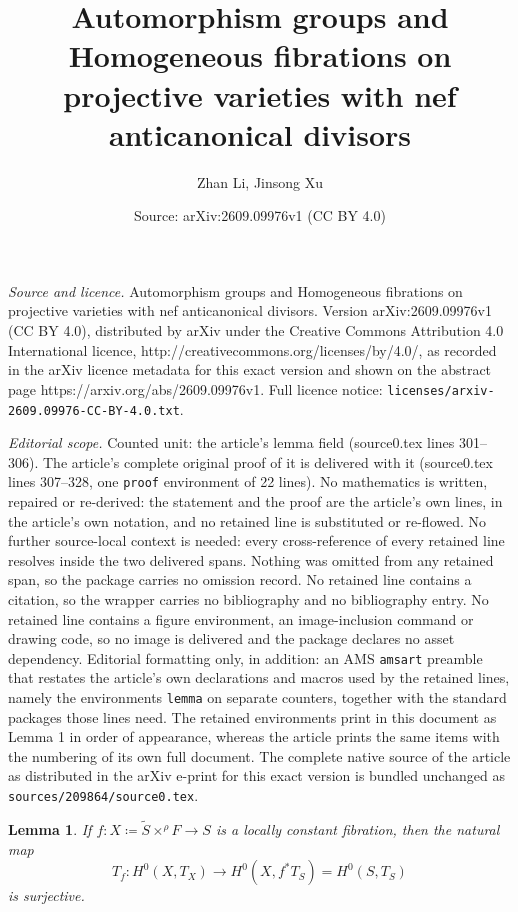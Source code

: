\documentclass[10pt,a4paper]{amsart}
\title{Automorphism groups and Homogeneous fibrations on projective varieties with nef anticanonical divisors}
\author{Zhan Li, Jinsong Xu}
\date{Source: arXiv:2609.09976v1 (CC BY 4.0)}
\newtheorem{lemma}{Lemma}
\newcommand{\ti}{\tilde}
\begin{document}
\maketitle

\noindent\emph{Source and licence.} Automorphism groups and Homogeneous fibrations on projective varieties with nef anticanonical divisors. Version arXiv:2609.09976v1 (CC BY 4.0), distributed by arXiv under the Creative Commons Attribution 4.0 International licence, http://creativecommons.org/licenses/by/4.0/, as recorded in the arXiv licence metadata for this exact version and shown on the abstract page https://arxiv.org/abs/2609.09976v1. Full licence notice: \texttt{licenses/arxiv-2609.09976-CC-BY-4.0.txt}.\par\smallskip

\noindent\textit{Editorial scope.} Counted unit: the article's lemma field (source0.tex lines 301--306). The article's complete original proof of it is delivered with it (source0.tex lines 307--328, one \texttt{proof} environment of 22 lines). No mathematics is written, repaired or re-derived: the statement and the proof are the article's own lines, in the article's own notation, and no retained line is substituted or re-flowed.  No further source-local context is needed: every cross-reference of every retained line resolves inside the two delivered spans.  Nothing was omitted from any retained span, so the package carries no omission record.  No retained line contains a citation, so the wrapper carries no bibliography and no bibliography entry.  No retained line contains a figure environment, an image-inclusion command or drawing code, so no image is delivered and the package declares no asset dependency.  Editorial formatting only, in addition: an AMS \texttt{amsart} preamble that restates the article's own declarations and macros used by the retained lines, namely the environments \texttt{lemma} on separate counters, together with the standard packages those lines need.  The retained environments print in this document as Lemma 1 in order of appearance, whereas the article prints the same items with the numbering of its own full document.  The complete native source of the article as distributed in the arXiv e-print for this exact version is bundled unchanged as \texttt{sources/209864/source0.tex}.
\begin{lemma}\label{lem: lift vector field}
    If $f: X \coloneqq \ti S \times^\rho F \to S$ is a locally constant fibration, then the natural map 
    \[
    T_f: H^0(X, T_X) \to H^0(X,f^*T_S)=H^0(S, T_S)
    \] is surjective. 
\end{lemma}
\end{document}
